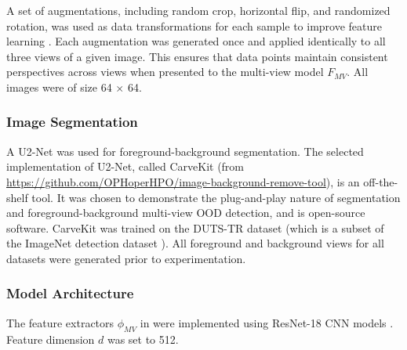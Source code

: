 A set of augmentations, including random crop, horizontal flip, and randomized rotation, was used as data transformations for each sample to improve feature learning \cite{yang2022openood,zhang2023openood,tack2020csi}. Each augmentation was generated once and applied identically to all three views of a given image. This ensures that data points maintain consistent perspectives across views when presented to the multi-view model $F_{MV}$. All images were of size 64 $\times$ 64.

\subsubsection{Image Segmentation}
A U2-Net \cite{qin2020u2} was used for foreground-background segmentation. The selected implementation of U2-Net, called CarveKit (from \href{https://github.com/OPHoperHPO/image-background-remove-tool}{https://github.com/OPHoperHPO/image-background-remove-tool}), is an off-the-shelf tool. It was chosen to demonstrate the plug-and-play nature of segmentation and foreground-background multi-view OOD detection, and is open-source software. CarveKit was trained on the DUTS-TR \cite{wang2017learning} dataset (which is a subset of the ImageNet detection dataset \cite{deng2009imagenet}). All foreground and background views for all datasets were generated prior to experimentation. %

\subsubsection{Model Architecture}
The feature extractors $\phi_{MV}$ in \sysa were implemented using ResNet-18 CNN models \cite{he2016deep}. Feature dimension $d$ was set to 512.

